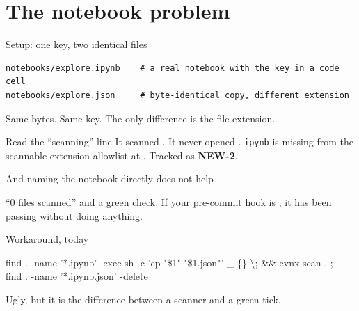 \documentclass[aspectratio=169,10pt]{beamer}
\begin{document}
\section{The notebook problem}

\begin{frame}[fragile]{Setup: one key, two identical files}
\begin{lstlisting}[style=evnxcode]
notebooks/explore.ipynb    # a real notebook with the key in a code cell
notebooks/explore.json     # byte-identical copy, different extension
\end{lstlisting}

  \vspace{0.6em}
  Same bytes. Same key. The only difference is the file extension.

  \vspace{0.8em}
\end{frame}

\begin{frame}[fragile]{}

  \vspace{0.4em}
  \begin{trap}{Read the ``scanning'' line}
    It scanned . It never opened .
    \texttt{ipynb} is missing from the scannable-extension allowlist at
    . Tracked as \textbf{NEW-2}.
  \end{trap}
\end{frame}

\begin{frame}[fragile]{And naming the notebook directly does not help}

  \vspace{0.4em}
  {\footnotesize ``0 files scanned'' and a green check. If your pre-commit hook
  is , it has been passing without doing anything.}

  \vspace{0.5em}
  \begin{block}{Workaround, today}
    \begin{center}\ttfamily\scriptsize
    find . -name '*.ipynb' -exec sh -c 'cp "\$1" "\$1.json"' \_ \{\} \textbackslash; \&\& evnx scan . ; \\
    find . -name '*.ipynb.json' -delete
    \end{center}
    \vspace{0.3em}
    Ugly, but it is the difference between a scanner and a green tick.
  \end{block}
\end{frame}
\end{document}
